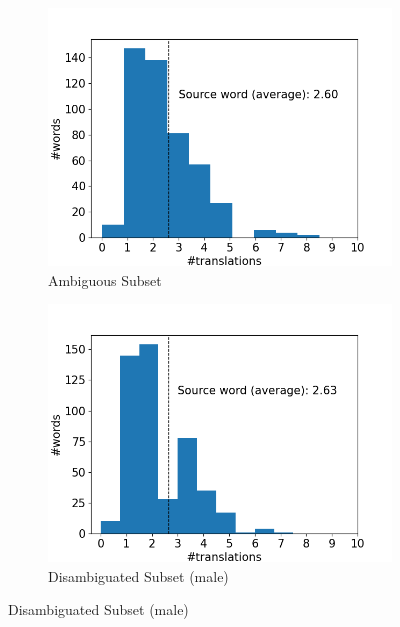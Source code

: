 \begin{figure}[!htb]
     \centering
     
     \begin{subfigure}{0.49\textwidth}
         \centering
         \includegraphics[width=\textwidth]{figures/alignment/word_translations_original.png}
         \caption{Ambiguous Subset}
         \label{fig:alignment_translation_ambiguous}
     \end{subfigure}
     \hfill
     \begin{subfigure}{0.49\textwidth}
         \centering
         \includegraphics[width=\textwidth]{figures/alignment/word_translations_male.png}
         \caption{Disambiguated Subset (male)}

\end{subfigure}
\end{figure}
